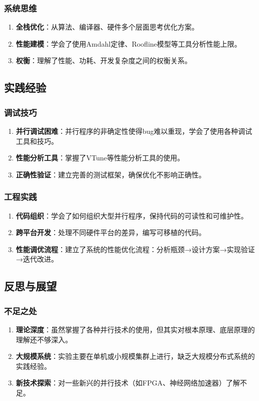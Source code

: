 \documentclass[a4paper]{article}
\begin{document}
	\subsubsection{系统思维}
	\begin{enumerate}
		\item \textbf{全栈优化}：从算法、编译器、硬件多个层面思考优化方案。
		\item \textbf{性能建模}：学会了使用Amdahl定律、Roofline模型等工具分析性能上限。
		
		\item \textbf{权衡}：理解了性能、功耗、开发复杂度之间的权衡关系。
	\end{enumerate}
	\subsection{实践经验}
	\subsubsection{调试技巧}
	\begin{enumerate}
		\item \textbf{并行调试困难}：并行程序的非确定性使得bug难以重现，学会了使用各种调试工具和技巧。
		\item \textbf{性能分析工具}：掌握了VTune等性能分析工具的使用。
		
		\item \textbf{正确性验证}：建立完善的测试框架，确保优化不影响正确性。
	\end{enumerate}
	\subsubsection{工程实践}
	\begin{enumerate}
		\item \textbf{代码组织}：学会了如何组织大型并行程序，保持代码的可读性和可维护性。
		\item \textbf{跨平台开发}：处理不同硬件平台的差异，编写可移植的代码。
		
		\item \textbf{性能调优流程}：建立了系统的性能优化流程：分析瓶颈→设计方案→实现验证→迭代改进。
	\end{enumerate}
	\subsection{反思与展望}
	\subsubsection{不足之处}
	\begin{enumerate}
		\item \textbf{理论深度}：虽然掌握了各种并行技术的使用，但其实对根本原理、底层原理的理解还不够深入。
		\item \textbf{大规模系统}：实验主要在单机或小规模集群上进行，缺乏大规模分布式系统的实践经验。
		
		\item \textbf{新技术探索}：对一些新兴的并行技术（如FPGA、神经网络加速器）了解不足。
	\end{enumerate}
\end{document}
